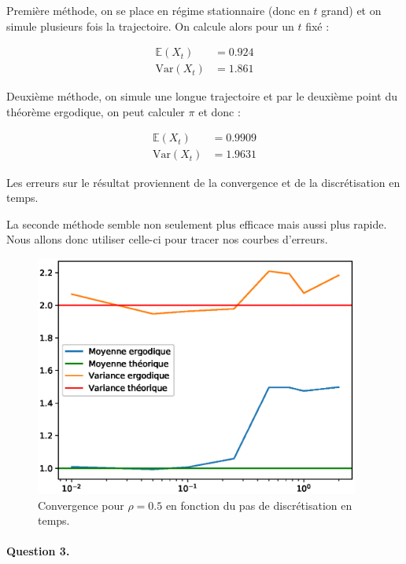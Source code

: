\documentclass[12pt,a4paper]{article}
\begin{document}
Première méthode, on se place en régime stationnaire (donc en $t$ grand) et on simule plusieurs fois la trajectoire. On calcule alors pour un $t$ fixé :

\begin{align*}
\mathbb{E}(X_t) &= 0.924 \\
\text{Var}(X_t) &= 1.861
\end{align*}

Deuxième méthode, on simule une longue trajectoire et par le deuxième point du théorème ergodique, on peut calculer $\pi$ et donc :

\begin{align*}
\mathbb{E}(X_t) &= 0.9909 \\
\text{Var}(X_t) &= 1.9631
\end{align*}

Les erreurs sur le résultat proviennent de la convergence et de la discrétisation en temps.

La seconde méthode semble non seulement plus efficace mais aussi plus rapide. Nous allons donc utiliser celle-ci pour tracer nos courbes d'erreurs.

\begin{figure}[H]
	\centering
	\includegraphics[width=0.95\textwidth]{dt.eps}
	\caption{Convergence pour $\rho = 0.5$ en fonction du pas de discrétisation en temps.}
\end{figure}


\paragraph*{Question 3.}
\end{document}
